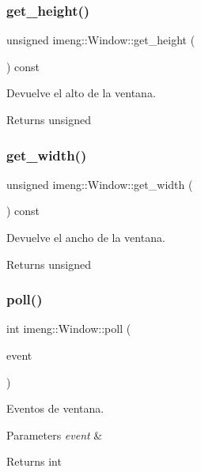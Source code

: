 \subsubsection{get\_height()}
{\footnotesize\ttfamily unsigned imeng\+::\+Window\+::get\+\_\+height (\begin{DoxyParamCaption}{ }\end{DoxyParamCaption}) const}



Devuelve el alto de la ventana. 

\begin{DoxyReturn}{Returns}
unsigned 
\end{DoxyReturn}
\mbox{\label{classimeng_1_1_window_abf4a518208ee9ee0ab890b1305536847}} 
\subsubsection{get\_width()}
{\footnotesize\ttfamily unsigned imeng\+::\+Window\+::get\+\_\+width (\begin{DoxyParamCaption}{ }\end{DoxyParamCaption}) const}



Devuelve el ancho de la ventana. 

\begin{DoxyReturn}{Returns}
unsigned 
\end{DoxyReturn}
\mbox{\label{classimeng_1_1_window_a68f843fde8ac1e653c1012711f3f8984}} 
\subsubsection{poll()}
{\footnotesize\ttfamily int imeng\+::\+Window\+::poll (\begin{DoxyParamCaption}\item[{S\+D\+L\+\_\+\+Event \&}]{event }\end{DoxyParamCaption})}



Eventos de ventana. 


\begin{DoxyParams}{Parameters}
{\em event} & \\
\hline
\end{DoxyParams}
\begin{DoxyReturn}{Returns}
int 
\end{DoxyReturn}
\mbox{\label{classimeng_1_1_window_a0456a61b96e02c3daf1b8754e1c4e6ea}} 
